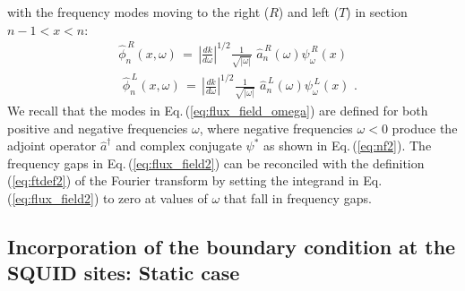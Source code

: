 %
with the frequency modes moving to the right ($R$)
and left ($T$) in section $n-1 < x < n$:
%
\begin{subequations} \label{eq:flux_field_omega}
\begin{eqnarray}
& \hat{\phi}_n^{\,R}(x,\omega) \, = \, \displaystyle{\left| \frac{d k}{d \omega} \right|^{1/2}
        \frac{1}{\sqrt{|\omega|}}} \, \, \hat{a}_n^{\,R}(\omega) \psi_{\omega}^{\,R}(x) \\[2mm]
& \, \, \hat{\phi}_n^{\,L}(x,\omega) \, = \, \displaystyle{\left| \frac{d k}{d \omega} \right|^{1/2}
        \frac{1}{\sqrt{|\omega|}}} \, \, \hat{a}_n^{\,L}(\omega) \psi_{\omega}^{\,L}(x) \, \, . 
\end{eqnarray}
\end{subequations}
%
We recall that the modes in Eq.\,(\ref{eq:flux_field_omega}) are defined for both positive and 
negative frequencies $\omega$, where negative frequencies $\omega<0$ produce the adjoint operator $\hat{a}^{\dagger}$ 
and complex conjugate $\psi^*$ as shown in Eq.\,(\ref{eq:nf2}). 
The frequency gaps in Eq.\,(\ref{eq:flux_field2}) can be reconciled with the definition 
(\ref{eq:ftdef2}) of the Fourier transform by setting the integrand in 
Eq.\,(\ref{eq:flux_field2}) to zero at values of $\omega$ that fall in frequency gaps. 



\subsection{Incorporation of the boundary condition at the SQUID sites: Static case} 
\label{subsec:bc_static}

